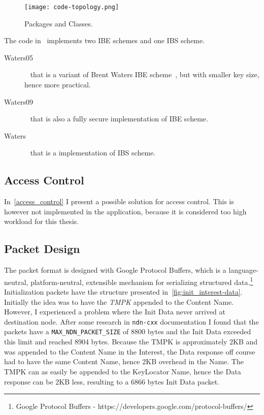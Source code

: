 \begin{figure}[ht]
  \centering
  \texttt{[image: code-topology.png]}
  \caption{Packages and Classes.}
  \label{fig:code-topology}
\end{figure}

The code in~\cite[identityBasedCrypto.py]{garseg15} implements two \gls{IBE} schemes and one \gls{IBS} scheme. 
\begin{description}
  \item[Waters05]~\cite{DBLP:journals/iacr/Naccache05} that is a variant of Brent Waters \gls{IBE} scheme~\cite{DBLP:journals/iacr/Waters04}, but with smaller key size, hence more practical.
  \item[Waters09]~\cite{DBLP:conf/crypto/Waters09} that is also a fully secure implementation of \gls{IBE} scheme.
  \item[Waters]~\cite{DBLP:journals/iacr/Waters04} that is a implementation of \gls{IBS} scheme.
\end{description}

\subsection{Access Control}
In~\autoref{access_control} I present a possible solution for access control.
This is however not implemented in the application, because it is considered too high workload for this thesis.

\subsection{Packet Design}
The packet format is designed with Google Protocol Buffers, which is a language-neutral, platform-neutral, extensible mechanism for serializing structured data.\footnote{Google Protocol Buffers - https://developers.google.com/protocol-buffers/}
Initialization packets have the structure presented in~\autoref{fig:init_interest-data}.
Initially the idea was to have the \textit{\gls{TMPK}} appended to the Content Name. 
However, I experienced a problem where the Init Data never arrived at destination node. 
After some research in \texttt{ndn-cxx} documentation I found that the packets have a \texttt{MAX\_NDN\_PACKET\_SIZE} of 8800 bytes and the Init Data exceeded this limit and reached 8904 bytes.
Because the \gls{TMPK} is approximately 2\gls{KB} and was appended to the Content Name in the Interest, the Data response off course had to have the same Content Name, hence 2\gls{KB} overhead in the Name. 
The \gls{TMPK} can as easily be appended to the KeyLocator Name, hence the Data response can be 2\gls{KB} less, resulting to a 6866 bytes Init Data packet.

